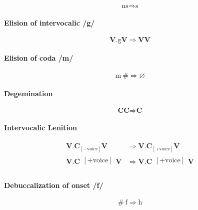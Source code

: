 \documentclass{report}
\begin{document}
\begin{equation}
  \text{ns} \Rightarrow \text{s}
\end{equation}

\paragraph{Elision of intervocalic /g/}

\begin{equation}
  \textbf{V}.\text{g}\textbf{V} \Rightarrow \textbf{VV}
\end{equation}

\paragraph{Elision of coda /m/}

\begin{equation}
  \text{m}\ \# \Rightarrow \varnothing
\end{equation}

\paragraph{Degemination}

\begin{equation}
  \textbf{CC} \Rightarrow \textbf{C}
\end{equation}

\paragraph{Intervocalic Lenition}

\begin{align}
  \textbf{V.C}_{[-\text{voice}]}\textbf{V} & \Rightarrow \textbf{V.C}_{[+\text{voice}]}\textbf{V} \\
  \textbf{V.C}\substack{[+\text{voice}] \\ [+\text{stop}]}\textbf{V} & \Rightarrow \textbf{V.C}\substack{[+\text{voice}] \\ [+\text{fricative}]}\textbf{V}
\end{align}

\paragraph{Debuccalization of onset /f/}

\begin{equation}
  \#\ \text{f} \Rightarrow \text{h}
\end{equation}
\end{document}
